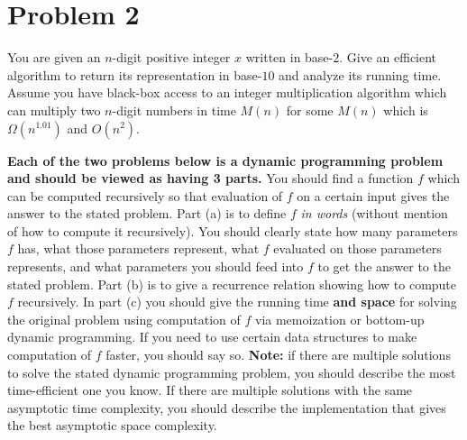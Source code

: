\documentclass[12pt]{article}
\begin{document}
\section*{Problem 2}

You are given an $n$-digit positive integer $x$ written in base-$2$. Give an efficient algorithm to return its representation in base-$10$ and analyze its running time. Assume you have black-box access to an integer multiplication algorithm which can multiply two $n$-digit numbers in time $M(n)$ for some $M(n)$ which is $\Omega(n^{1.01})$ and $O(n^2)$.

\bigskip
\bigskip
\bigskip

\textbf{Each of the two problems below is a dynamic programming problem and should be viewed as having 3 parts.} You should find a function $f$ which can be computed recursively so that evaluation of $f$ on a certain input gives the answer to the stated problem. Part (a) is to define $f$ {\em in words} (without mention of how to compute it recursively). You should clearly state how many parameters $f$ has, what those parameters represent, what $f$ evaluated on those parameters represents, and what parameters you should feed into $f$ to get the answer to the stated problem. Part (b) is to give a recurrence relation showing how to compute $f$ recursively. In part (c) you should give the running time \textbf{and space} for solving the original problem using computation of $f$ via memoization or bottom-up dynamic programming. If you need to use certain data structures to make computation of $f$ faster, you should say so. \textbf{Note:} if there are multiple solutions to solve the stated dynamic programming problem, you should describe the most time-efficient one you know. If there are multiple solutions with the same asymptotic time complexity, you should describe the implementation that gives the best asymptotic space complexity.
\end{document}
